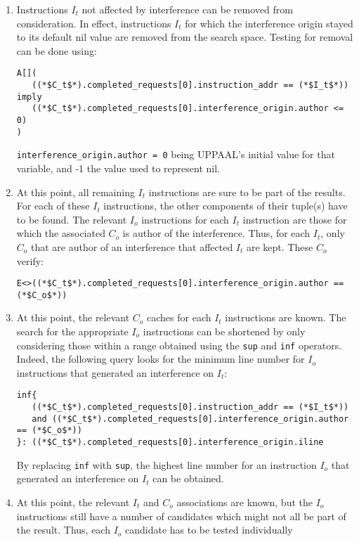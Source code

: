 \begin{enumerate}
\item
   Instructions $I_t$ not affected by interference can be removed from
   consideration. In effect, instructions $I_t$ for which the interference
   origin stayed to its default nil value are removed from the search space.
   Testing for removal can be done using:
\begin{lstlisting}
A[](
   ((*$C_t$*).completed_requests[0].instruction_addr == (*$I_t$*)) imply
   ((*$C_t$*).completed_requests[0].interference_origin.author <= 0)
)
\end{lstlisting}
   \lstinline!interference_origin.author = 0! being UPPAAL's initial value for
   that variable, and -1 the value used to represent nil.
\item
   At this point, all remaining $I_t$ instructions are sure to be part of the
   results.  For each of these $I_t$ instructions, the other components of
   their tuple(s) have to be found. The relevant $I_o$ instructions for each
   $I_t$ instruction are those for which the associated $C_o$ is author of the
   interference. Thus, for each $I_t$, only $C_o$ that are author of an
   interference that affected $I_t$ are kept. These $C_o$ verify:
\begin{lstlisting}
E<>((*$C_t$*).completed_requests[0].interference_origin.author == (*$C_o$*))
\end{lstlisting}
\item
   At this point, the relevant $C_o$ caches for each $I_t$ instructions are
   known. The search for the appropriate $I_o$ instructions can be shortened by
   only considering those within a range obtained using the \lstinline!sup! and
   \lstinline!inf! operators. Indeed, the following query looks for the minimum
   line number for $I_o$ instructions that generated an interference on $I_t$:
\begin{lstlisting}
inf{
   ((*$C_t$*).completed_requests[0].instruction_addr == (*$I_t$*))
   and ((*$C_t$*).completed_requests[0].interference_origin.author == (*$C_o$*))
}: ((*$C_t$*).completed_requests[0].interference_origin.iline
\end{lstlisting}
By replacing \lstinline!inf! with \lstinline!sup!, the highest line number for
an instruction $I_o$ that generated an interference on $I_t$ can be obtained.
\item
   At this point, the relevant $I_t$ and $C_o$ associations are known, but the
   $I_o$ instructions still have a number of candidates which might not all be
   part of the result. Thus, each $I_o$ candidate has to be tested individually

\end{enumerate}
